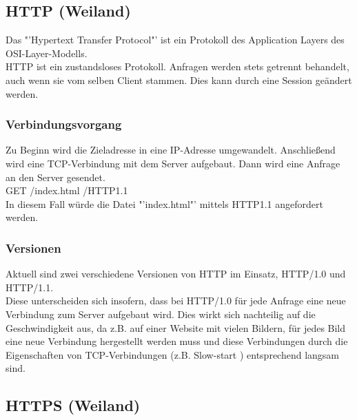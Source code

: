 \subsection{HTTP (Weiland)}

Das "'Hypertext Transfer Protocol"' ist ein Protokoll des Application Layers des OSI-Layer-Modells.
\\
HTTP ist ein zustandsloses Protokoll. Anfragen werden stets getrennt behandelt, auch wenn sie vom selben Client stammen. Dies kann durch eine Session geändert werden.
\subsubsection{Verbindungsvorgang}

Zu Beginn wird die Zieladresse in eine IP-Adresse umgewandelt. Anschließend wird eine TCP-Verbindung  mit dem Server aufgebaut. 
Dann wird eine Anfrage an den Server gesendet.
\\
GET /index.html /HTTP1.1
\\
In diesem Fall würde die Datei "'index.html"' mittels HTTP1.1 angefordert werden.

\subsubsection{Versionen}
Aktuell sind zwei verschiedene Versionen von HTTP im Einsatz, HTTP/1.0 und HTTP/1.1.
\\
Diese unterscheiden sich insofern, dass bei HTTP/1.0 für jede Anfrage eine neue Verbindung zum Server aufgebaut wird. Dies wirkt sich nachteilig auf die Geschwindigkeit aus, da z.B. auf einer Website mit vielen Bildern, für jedes Bild eine neue Verbindung hergestellt werden muss und diese Verbindungen durch die Eigenschaften von TCP-Verbindungen (z.B. Slow-start ) entsprechend langsam sind.

\subsection{HTTPS (Weiland)}